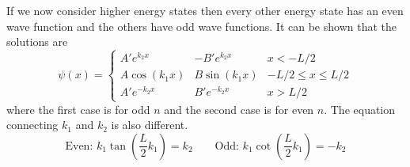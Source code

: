 \documentclass{article}
\begin{document}
    If we now consider higher energy states then every other energy state has an even wave function and the others have odd wave functions.
    It can be shown that the solutions are
    \[
        \psi(x) = \left\{
        \begin{array}{lll}
            A'e^{k_2x} & -B'e^{k_2x} & x < -L/2\\
            A\cos(k_1 x) & B\sin(k_1x) & -L/2\le x\le L/2\\
            A' e^{-k_2 x} & B'e^{-k_2x} & x > L/2
        \end{array}
        \right.
    \]
    where the first case is for odd \(n\) and the second case is for even \(n\).
    The equation connecting \(k_1\) and \(k_2\) is also different.
    \[\text{Even: } k_1\tan\left(\frac{L}{2}k_1\right) = k_2\qquad \text{Odd: } k_1\cot\left(\frac{L}{2}k_1\right) = -k_2\]
    
\end{document}
